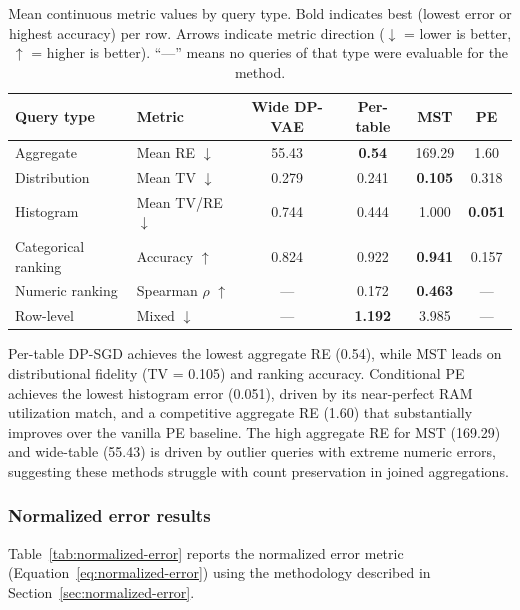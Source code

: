 \documentclass[12pt,letterpaper]{article}
\renewcommand{\_}{\textunderscore\allowbreak}
\begin{document}
\begin{table}[H]
\centering
\begin{tabular*}{\textwidth}{@{\extracolsep{\fill}}llcccc}
\toprule
\textbf{Query type} & \textbf{Metric} & \textbf{Wide DP-VAE} & \textbf{Per-table} & \textbf{MST} & \textbf{PE} \\
\midrule
Aggregate & Mean RE $\downarrow$ & 55.43 & \textbf{0.54} & 169.29 & 1.60 \\
Distribution & Mean TV $\downarrow$ & 0.279 & 0.241 & \textbf{0.105} & 0.318 \\
Histogram & Mean TV/RE $\downarrow$ & 0.744 & 0.444 & 1.000 & \textbf{0.051} \\
Categorical ranking & Accuracy $\uparrow$ & 0.824 & 0.922 & \textbf{0.941} & 0.157 \\
Numeric ranking & Spearman $\rho$ $\uparrow$ & --- & 0.172 & \textbf{0.463} & --- \\
Row-level & Mixed $\downarrow$ & --- & \textbf{1.192} & 3.985 & --- \\
\bottomrule
\end{tabular*}
\caption{Mean continuous metric values by query type. Bold indicates best (lowest error or highest accuracy) per row. Arrows indicate metric direction ($\downarrow$ = lower is better, $\uparrow$ = higher is better). ``---'' means no queries of that type were evaluable for the method.}
\label{tab:continuous-metrics}
\end{table}

Per-table DP-SGD achieves the lowest aggregate RE (0.54), while MST leads on distributional fidelity (TV = 0.105) and ranking accuracy. Conditional PE achieves the lowest histogram error (0.051), driven by its near-perfect RAM utilization match, and a competitive aggregate RE (1.60) that substantially improves over the vanilla PE baseline. The high aggregate RE for MST (169.29) and wide-table (55.43) is driven by outlier queries with extreme numeric errors, suggesting these methods struggle with count preservation in joined aggregations.

\subsubsection{Normalized error results}

Table~\ref{tab:normalized-error} reports the normalized error metric (Equation~\ref{eq:normalized-error}) using the methodology described in Section~\ref{sec:normalized-error}.
\end{document}
